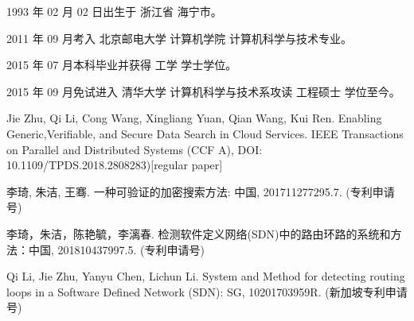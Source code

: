 \begin{resume}


  1993 年 02 月 02 日出生于 浙江省 海宁市。

  2011 年 09 月考入 北京邮电大学 计算机学院 计算机科学与技术专业。

  2015 年 07 月本科毕业并获得 工学 学士学位。

  2015 年 09 月免试进入 清华大学 计算机科学与技术系攻读 工程硕士 学位至今。



  \begin{publications}[before=\publicationskip,after=\publicationskip]
    \item Jie Zhu, Qi Li, Cong Wang, Xingliang Yuan, Qian Wang, Kui Ren. Enabling Generic,Verifiable, and Secure Data Search in Cloud Services. IEEE Transactions on Parallel and Distributed Systems (CCF A), DOI: 10.1109/TPDS.2018.2808283)[regular paper]
  \end{publications}


  \begin{achievements}
    \item 李琦, 朱洁, 王骞. 一种可验证的加密搜索方法: 中国, 201711277295.7. (专利申请号)
    \item 李琦，朱洁，陈艳毓，李漓春. 检测软件定义网络(SDN)中的路由环路的系统和方法：中国, 201810437997.5. (专利申请号)
    \item Qi Li, Jie Zhu, Yanyu Chen, Lichun Li. System and Method for detecting routing loops in a Software Defined Network (SDN): SG, 10201703959R. (新加坡专利申请号)
  \end{achievements}

\end{resume}
